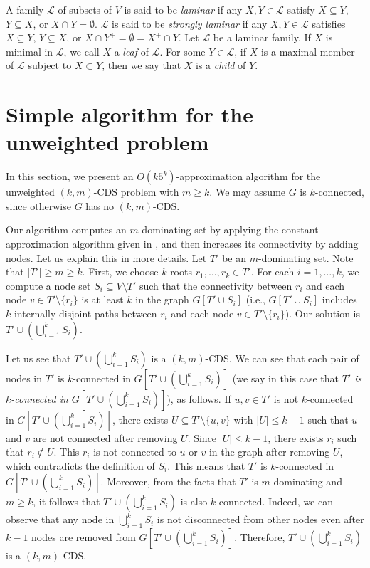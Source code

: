 \documentclass[11pt]{article}
\newcommand{\Lfam}{\mathcal{L}}
\begin{document}
A family $\Lfam$ of subsets of $V$ is said to be 
\emph{laminar}
if any $X,Y \in \Lfam$ satisfy $X \subseteq Y$, $Y \subseteq X$,
or $X \cap Y = \emptyset$.
$\Lfam$ is said to be
\emph{strongly laminar}
if any $X,Y \in \Lfam$ satisfies $X \subseteq Y$, $Y \subseteq X$,
or $X \cap Y^+ = \emptyset = X^+ \cap Y$.
Let $\Lfam$ be a laminar family.
If $X$ is minimal in $\Lfam$,
we call $X$ a \emph{leaf} of $\Lfam$.
For some $Y \in \Lfam$,
if $X$ is a maximal member of $\Lfam$ 
subject to $X \subset Y$,
then we say that $X$ is a \emph{child} of $Y$.


\section{Simple algorithm for the unweighted problem}
\label{sec.simple}

In this section, we present an $O(k 5^k )$-approximation algorithm for the unweighted
$(k,m)$-CDS problem
with $m \geq k$.
We may assume $G$ is $k$-connected,
since otherwise $G$ has no $(k,m)$-CDS.

Our algorithm computes an $m$-dominating set by 
applying the constant-approximation algorithm given in
\cite{Shang:2007jg},
and then increases its connectivity by adding nodes.
Let us explain this in more details.
Let $T'$ be an $m$-dominating set.
Note that $|T'|\geq m \geq k$.
First,
we choose $k$ roots $r_1,\ldots,r_k \in T'$.
For each $i=1,\ldots,k$,
we compute a node set $S_i \subseteq V \setminus T'$
such that the connectivity between $r_i$ and each node $v \in T'\setminus
\{r_i\}$ is at least $k$ in the graph $G[T' \cup S_i]$
(i.e., $G[T' \cup S_i]$ includes $k$ internally disjoint paths between $r_i$
and each node $v \in T' \setminus \{r_i\}$).
Our solution is $T' \cup (\bigcup_{i=1}^k S_i)$.

Let us see that $T' \cup (\bigcup_{i=1}^k S_i)$ is a $(k,m)$-CDS.
We can see that each pair of nodes in $T'$ is $k$-connected in
$G[T' \cup (\bigcup_{i=1}^k S_i)]$
(we say in this case that \emph{$T'$ is $k$-connected in $G[T' \cup (\bigcup_{i=1}^k S_i)]$}),
as follows.
If $u,v \in T'$ is not $k$-connected in $G[T' \cup (\bigcup_{i=1}^k
S_i)]$,
there exists $U \subseteq T' \setminus \{u,v\}$
with $|U|\leq k-1$
such that $u$ and $v$ are not connected after removing $U$.
Since $|U| \leq k-1$, there exists $r_i$ such that $r_i \notin U$.
This $r_i$ is not connected to $u$ or $v$ in the graph after removing
$U$, which contradicts the definition of $S_i$.
This means that $T'$ is $k$-connected in
$G[T' \cup (\bigcup_{i=1}^k S_i)]$.
Moreover, from the facts that $T'$ is $m$-dominating and $m \geq k$,
it follows that $T'\cup (\bigcup_{i=1}^k S_i)$ is also $k$-connected.
Indeed, we can observe that any node in $\bigcup_{i=1}^k S_i$ is not disconnected from other
nodes even after $k-1$ nodes are removed from $G[T'\cup (\bigcup_{i=1}^k S_i)]$.
Therefore,  $T' \cup (\bigcup_{i=1}^k S_i)$ is a $(k,m)$-CDS.
\end{document}
